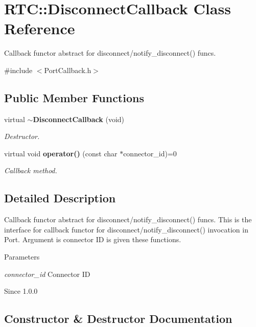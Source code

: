 \section{RTC::DisconnectCallback Class Reference}
\label{classRTC_1_1DisconnectCallback}


Callback functor abstract for disconnect/notify\_\-disconnect() funcs.  




{\ttfamily \#include $<$PortCallback.h$>$}

\subsection*{Public Member Functions}
\begin{DoxyCompactItemize}
\item 
virtual {\bf $\sim$DisconnectCallback} (void)
\begin{DoxyCompactList}\small\item\em Destructor. \item\end{DoxyCompactList}\item 
virtual void {\bf operator()} (const char $\ast$connector\_\-id)=0
\begin{DoxyCompactList}\small\item\em Callback method. \item\end{DoxyCompactList}\end{DoxyCompactItemize}


\subsection{Detailed Description}
Callback functor abstract for disconnect/notify\_\-disconnect() funcs. This is the interface for callback functor for disconnect/notify\_\-disconnect() invocation in Port. Argument is connector ID is given these functions.


\begin{DoxyParams}{Parameters}
\item[{\em connector\_\-id}]Connector ID\end{DoxyParams}
\begin{DoxySince}{Since}
1.0.0 
\end{DoxySince}


\subsection{Constructor \& Destructor Documentation}
